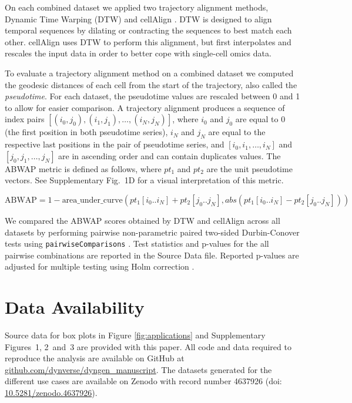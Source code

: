 \documentclass[10pt, a4paper]{article}
\begin{document}
On each combined dataset we applied two trajectory alignment methods,
Dynamic Time Warping (DTW)
\cite{giorgino_computingvisualizingdynamic_2009} and cellAlign
\cite{alpert_alignmentsinglecelltrajectories_2018}. DTW is designed
to align temporal sequences by dilating or contracting the sequences to
best match each other. cellAlign uses DTW to perform this alignment, but
first interpolates and rescales the input data in order to better cope
with single-cell omics data.

To evaluate a trajectory alignment method on a combined dataset we
computed the geodesic distances of each cell from the start of the
trajectory, also called the \emph{pseudotime}. For each dataset, the
pseudotime values are rescaled between 0 and 1 to allow for easier
comparison. A trajectory alignment produces a sequence of index pairs
\([(i_0, j_0), (i_1, j_1), \ldots, (i_N, j_N)]\), where \(i_0\) and
\(j_0\) are equal to 0 (the first position in both pseudotime series),
\(i_N\) and \(j_N\) are equal to the respective last positions in the
pair of pseudotime series, and \([i_0, i_1, \ldots, i_N]\) and
\([j_0, j_1, \ldots, j_N]\) are in ascending order and can contain
duplicates values. The ABWAP metric is defined as follows, where
\(pt_1\) and \(pt_2\) are the unit pseudotime vectors. See Supplementary
Fig.~1D for a visual interpretation of this metric.

\begin{equation}
  \textrm{ABWAP} = 1 - \textrm{area\_under\_curve}(pt_1[i_0 .. i_N] + pt_2[j_0 .. j_N], abs(pt_1[i_0 .. i_N] - pt_2[j_0 .. j_N]))
\end{equation}

We compared the ABWAP scores obtained by DTW and cellAlign across all
datasets by performing pairwise non-parametric paired two-sided
Durbin-Conover tests
\cite{conover_multiplecomparisonsprocedures_1979} using
\texttt{pairwiseComparisons}
\cite{patil_pairwisecomparisonsmultiplepairwise_2019}. Test
statistics and p-values for the all pairwise combinations are reported
in the Source Data file. Reported p-values are adjusted for multiple
testing using Holm correction
\cite{holm_simplesequentiallyrejective_1979}.

\section{Data Availability}\label{data-availability}

Source data for box plots in Figure \ref{fig:applications} and
Supplementary Figures~1, 2~and~3 are provided with this paper. All code
and data required to reproduce the analysis are available on GitHub at
\href{https://github.com/dynverse/dyngen_manuscript}{github.com/dynverse/dyngen\_manuscript}.
The datasets generated for the different use cases are available on
Zenodo with record number 4637926 (doi:
\href{https://doi.org/10.5281/zenodo.4637926}{10.5281/zenodo.4637926}).
\end{document}
